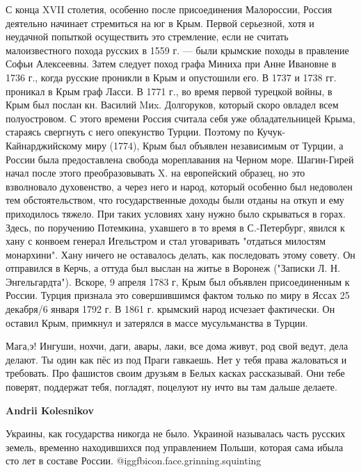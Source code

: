 \begin{itemize}
\begin{itemize}
С конца XVII столетия, особенно после присоединения Малороссии, Россия
деятельно начинает стремиться на юг в Крым. Первой серьезной, хотя и неудачной
попыткой осуществить это стремление, если не считать малоизвестного похода
русских в 1559 г. — были крымские походы в правление Софьи Алексеевны. Затем
следует поход графа Миниха при Анне Ивановне в 1736 г., когда русские проникли
в Крым и опустошили его. В 1737 и 1738 гг. проникал в Крым граф Ласси. В 1771
г., во время первой турецкой войны, в Крым был послан кн. Василий Mиx.
Долгоруков, который скоро овладел всем полуостровом. С этого времени Россия
считала себя уже обладательницей Крыма, стараясь свергнуть с него опекунство
Турции. Поэтому по Кучук-Кайнарджийскому миру (1774), Крым был объявлен
независимым от Турции, а России была предоставлена свобода мореплавания на
Черном море. Шагин-Гирей начал после этого преобразовывать X. на европейский
образец, но это взволновало духовенство, а через него и народ, который особенно
был недоволен тем обстоятельством, что государственные доходы были отданы на
откуп и ему приходилось тяжело. При таких условиях хану нужно было скрываться в
горах. Здесь, по поручению Потемкина, ухавшего в то время в С.-Петербург,
явился к хану с конвоем генерал Игельстром и стал уговаривать "отдаться
милостям монархини". Хану ничего не оставалось делать, как последовать этому
совету. Он отправился в Керчь, а оттуда был выслан на житье в Воронеж ("Записки
Л. Н. Энгельгардта"). Вскоре, 9 апреля 1783 г, Крым был объявлен присоединенным
к России. Турция признала это совершившимся фактом только по миру в Яссах 25
декабря/6 января 1792 г. В 1861 г. крымский народ исчезает фактически. Он
оставил Крым, примкнул и затерялся в массе мусульманства в Турции.


Мага,э! Ингуши, нохчи, даги, авары, лаки, все дома живут, род свой ведут, дела
делают. Ты один как пёс из под Праги гавкаешь. Нет у тебя права жаловаться и
требовать. Про фашистов своим друзьям в Белых касках рассказывай. Они тебе
поверят, поддержат тебя, погладят, поцелуют ну ичто вы там дальше делаете.

\textbf{Andrii Kolesnikov} 

Украины, как государства никогда не было. Украиной называлась часть русских
земель, временно находившихся под управлением Польши, которая сама ибыла сто лет
в составе России. @igg{fbicon.face.grinning.squinting} 

\end{itemize} %


\end{itemize}
